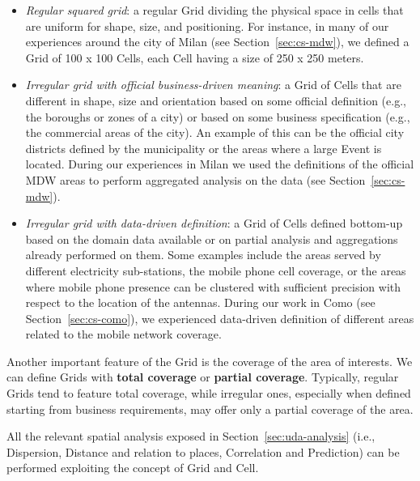 \begin{itemize}
\item \textit{Regular squared grid}:  a regular \textsf{Grid} dividing the physical space in cells that are uniform for shape, size, and positioning. For instance, in many of our experiences around the city of Milan (see Section~\ref{sec:cs-mdw}), we defined a \textsf{Grid} of 100 x 100 \textsf{Cell}s, each \textsf{Cell} having a size of 250 x 250 meters.

\item \textit{Irregular grid with official business-driven meaning}: a \textsf{Grid} of \textsf{Cell}s that are different in shape, size and orientation based on some official definition (e.g., the boroughs or zones of a city) or based on some business specification (e.g., the commercial areas of the city). An example of this can be the official city districts defined by the municipality or the areas where a large \textsf{Event} is located. During our experiences in Milan we used the definitions of the official MDW areas to perform aggregated analysis on the data (see Section~\ref{sec:cs-mdw}).

\item \textit{Irregular grid with data-driven definition}: a \textsf{Grid} of \textsf{Cell}s defined bottom-up based on the domain data available or on partial analysis and aggregations already performed on them. Some examples include the areas served by different electricity sub-stations, the mobile phone cell coverage, or the areas where mobile phone presence can be clustered with sufficient precision with respect to the location of the antennas. During our work in Como (see Section~\ref{sec:cs-como}), we experienced data-driven definition of different areas related to the mobile network coverage. 

\end{itemize}
Another important feature of the \textsf{Grid} is the coverage of the area of interests. We can define \textsf{Grid}s with \textbf{total coverage} or \textbf{partial coverage}. Typically, regular \textsf{Grid}s tend to feature total coverage, while irregular ones, especially when defined starting from business requirements, may offer only a partial coverage of the area.

All the relevant spatial analysis exposed in Section~\ref{sec:uda-analysis} (i.e., Dispersion, Distance and relation to places, Correlation and Prediction) can be performed exploiting the concept of \textsf{Grid} and \textsf{Cell}.

